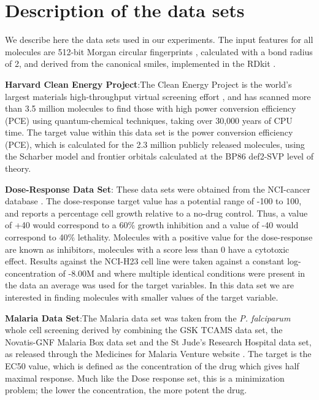 \section{Description of the data sets}

We describe here the data sets used in our experiments. The input features for all molecules are 512-bit Morgan circular fingerprints \cite{Rogers_2010}, calculated with a bond radius of 2, and derived from the canonical smiles, implemented in the RDkit \cite{rdkit}.

\textbf{Harvard Clean Energy Project}:The Clean Energy Project is the world's largest materials high-throughput virtual screening effort \cite{Hachmann_2014,Hachmann_2011}, and has scanned more than 3.5 million molecules to find those with high power conversion efficiency (PCE) using quantum-chemical techniques, taking over 30,000 years of CPU time. The target value within this data set is the power conversion efficiency (PCE), which is calculated for the 2.3 million publicly released molecules, using the Scharber model \cite{Dennler_2008} and frontier orbitals calculated at the BP86 \cite{Perdew_1986,Becke_1993} \/ def2-SVP \cite{Weigend_2005} level of theory.

\textbf{Dose-Response Data Set}: These data sets were obtained from the NCI-cancer database \cite{_nci_}.  The dose-response target value has a potential range of -100 to 100, and reports a percentage cell growth relative to a no-drug control.  Thus, a value of +40 would correspond to a 60\% growth inhibition and a value of -40 would correspond to 40\% lethality.  Molecules with a positive value for the dose-response are known as inhibitors, molecules with a score less than 0 have a cytotoxic effect. Results against the NCI-H23 cell line were taken against a constant log-concentration of -8.00M and where multiple identical conditions were present in the data an average was used for the target variables. In this data set we are interested in finding molecules with  smaller values of the target variable.


\textbf{Malaria Data Set}:The Malaria data set was taken from the \textit{P. falciparum} whole cell screening derived by combining the GSK TCAMS data set, the Novatis-GNF Malaria Box data set and the St Jude's Research Hospital data set, as released through the Medicines for Malaria Venture website \cite{23798988}.  The target is the EC50 value, which is defined as the concentration of the drug which gives half maximal response.  Much like the Dose response set, this is a minimization problem; the lower the concentration, the more potent the drug.
